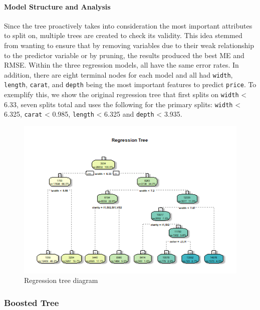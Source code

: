\documentclass[
  paper=a4,
  ,captions=tableheading
]{scrartcl}
\begin{document}
\hypertarget{model-structure-and-analysis}{%
\paragraph{Model Structure and
Analysis}\label{model-structure-and-analysis}}

Since the tree proactively takes into consideration the most important
attributes to split on, multiple trees are created to check its
validity. This idea stemmed from wanting to ensure that by removing
variables due to their weak relationship to the predictor variable or by
pruning, the results produced the best ME and RMSE. Within the three
regression models, all have the same error rates. In addition, there are
eight terminal nodes for each model and all had \texttt{width},
\texttt{length}, \texttt{carat}, and \texttt{depth} being the most
important features to predict \texttt{price}. To exemplify this, we show
the original regression tree that first splits on \texttt{width}
\textless{} 6.33, seven splits total and uses the following for the
primary splits: \texttt{width} \textless{} 6.325, \texttt{carat}
\textless{} 0.985, \texttt{length} \textless{} 6.325 and \texttt{depth}
\textless{} 3.935.

\begin{figure}[H]

{\centering \includegraphics[width=\linewidth,]{Diamonds_PDF_files/figure-latex/Default Regression Tree-1} 

}

\caption{Regression tree diagram}\label{fig:Default Regression Tree}
\end{figure}

\hypertarget{boosted-tree}{%
\subsubsection{Boosted Tree}\label{boosted-tree}}
\end{document}
